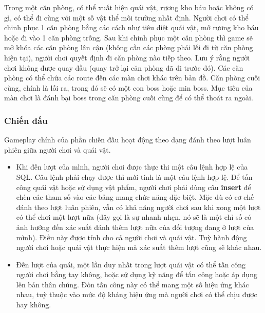 \hspace*{0.5cm}Trong một căn phòng, có thể xuất hiện quái vật, rương kho báu hoặc không có gì, có thể đi cùng với một số vật thể môi trường nhất định. Người chơi có thể chinh phục 1 căn phòng bằng các cách như tiêu diệt quái vật, mở rương kho báu hoặc đi vào 1 căn phòng trống. Sau khi chinh phục một căn phòng thì game sẽ mở khóa các căn phòng lân cận (không cần các phòng phải lối đi từ căn phòng hiện tại), người chơi quyết định đi căn phòng nào tiếp theo. Lưu ý rằng người chơi không được quay đầu (quay trở lại căn phòng đã đi trước đó). Các căn phòng có thể chứa các route đến các màn chơi khác trên bản đồ. Căn phòng cuối cùng, chính là lối ra, trong đó sẽ có một con boss hoặc min boss. Mục tiêu của màn chơi là đánh bại boss trong căn phòng cuối cùng để có thể thoát ra ngoài.\\
\subsubsection{Chiến đấu}
\hspace*{0.5cm}Gameplay chính của phần chiến đấu hoạt động theo dạng đánh theo lượt luân phiên giữa người chơi và quái vật.

\begin{itemize}
	\item Khi đến lượt của mình, người chơi được thực thi một câu lệnh hợp lệ của SQL. Câu lệnh phải chạy được thì mới tính là một câu lệnh hợp lệ. Để tấn công quái vật hoặc sử dụng vật phẩm, người chơi phải dùng câu \textbf{insert} để chèn các tham số vào các bảng mang chức năng đặc biệt. Mặc dù có cơ chế đánh theo lượt luân phiên, vẫn có khả năng người chơi sau khi xong một lượt có thể chơi một lượt nữa (đây gọi là sự nhanh nhẹn, nó sẽ là một chỉ số có ảnh hưởng đến xác suất đánh thêm lượt nữa của đối tượng đang ở lượt của mình). Điều này được tính cho cả người chơi và quái vật. Tuỳ hành động người chơi hoặc quái vật thực hiện mà xác suất thêm lượt cũng sẽ khác nhau.
	\item Đến lượt của quái, một lần duy nhất trong lượt quái vật có thể tấn công người chơi bằng tay không, hoặc sử dụng kỹ năng để tấn công hoặc áp dụng lên bản thân chúng. Đòn tấn công này có thể mang một số hiệu ứng khác nhau, tuỳ thuộc vào mức độ kháng hiệu ứng mà người chơi có thể chịu được hay không.
\end{itemize}

